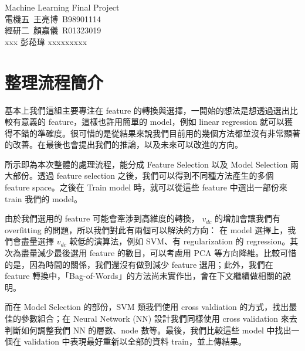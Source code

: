 

\newcommand{\link}[2]{ \href{#1}{\textcolor{Gray}{#2}}}
\newcommand{\statatab}[1]{
\begin{table}[H]\centering\begin{threeparttable}
\end{threeparttable}\end{table}}

\pagestyle{main}

\setlength{\baselineskip}{1.75em}
\setlength{\parskip}{0.5em}

\thispagestyle{empty}
\begin{center}
{\optima\LARGE Machine Learning Final Project}\\[1em]
電機五~王亮博~B98901114 \\
經研二~顏嘉儀~R01323019 \\
xxx 彭菘瑋 xxxxxxxxx
\end{center}

\section{整理流程簡介}
基本上我們這組主要專注在 feature 的轉換與選擇，一開始的想法是想透過選出比較有意義的 feature，這樣也許用簡單的 model，例如 linear regression 就可以獲得不錯的準確度。很可惜的是從結果來說我們目前用的幾個方法都並沒有非常顯著的改善。在最後也會提出我們的推論，以及未來可以改進的方向。

 所示即為本次整體的處理流程，能分成 Feature Selection 以及 Model Selection 兩大部份。透過 feature selection 之後，我們可以得到不同種方法產生的多個 feature space。之後在 Train model 時，就可以從這些 feature 中選出一部份來 train 我們的 model。

由於我們選用的 feature 可能會牽涉到高維度的轉換， $v_{dc}$ 的增加會讓我們有 overfitting 的問題，所以我們對此有兩個可以解決的方向：
在 model 選擇上，我們會盡量選擇 $v_{dc}$ 較低的演算法，例如 SVM、有 regularization 的 regression。其次為盡量減少最後選用 feature 的數目，可以考慮用 PCA 等方向降維。比較可惜的是，因為時間的關係，我們還沒有做到減少 feature 選用；此外，我們在 feature 轉換中，「Bag-of-Words」的方法尚未實作出，會在下文繼續做相關的說明。

而在 Model Selection 的部份，SVM 類我們使用 cross valdiation 的方式，找出最佳的參數組合；在 Neural Network (NN) 設計我們同樣使用 cross validation 來去判斷如何調整我們 NN 的層數、node 數等。最後，我們比較這些 model 中找出一個在 validation 中表現最好重新以全部的資料 train，並上傳結果。

